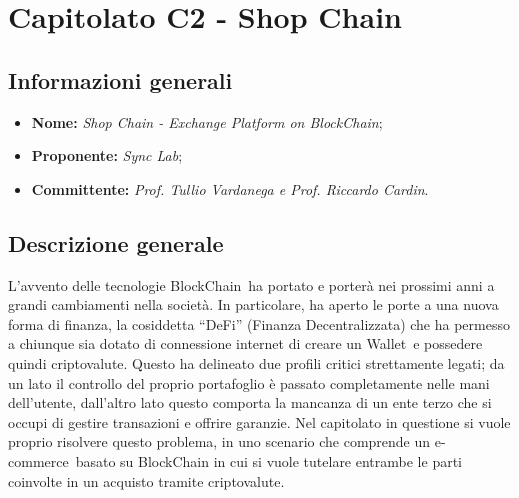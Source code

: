 \section{Capitolato C2 - Shop Chain}\label{section:c2}

\subsection{Informazioni generali}
\begin{itemize}
	\item \textbf{Nome:} \textit{Shop Chain - Exchange Platform on	BlockChain\glo};
	\item \textbf{Proponente:} \textit{Sync Lab};
	\item \textbf{Committente:} \textit{Prof. Tullio Vardanega e Prof. Riccardo Cardin}.
\end{itemize}

\subsection{Descrizione generale}
L'avvento delle tecnologie BlockChain\glo\ ha portato e porterà nei prossimi anni a grandi cambiamenti nella società. 
In particolare, ha aperto le porte a una nuova forma di finanza, la cosiddetta “DeFi” (Finanza Decentralizzata) che ha permesso a chiunque sia dotato di connessione internet di creare un Wallet\glo\ e possedere quindi criptovalute\glo.
Questo ha delineato due profili critici strettamente legati; da un lato il controllo del proprio portafoglio è passato completamente nelle mani dell'utente, dall'altro lato questo comporta la mancanza di un ente terzo che si occupi di gestire transazioni e offrire garanzie.
\newline
Nel capitolato in questione si vuole proprio risolvere questo problema, in uno scenario che comprende un e-commerce\glo\ basato su BlockChain\glo{} in cui si vuole tutelare entrambe le parti coinvolte in un acquisto tramite criptovalute\glo{}.

